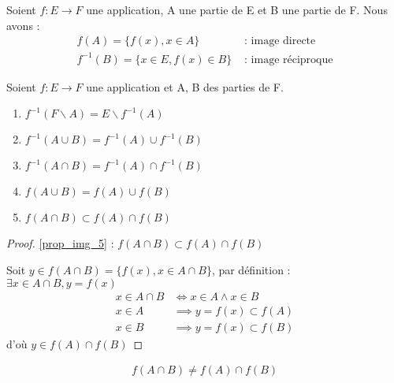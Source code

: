 \begin{definition}
	Soient $f:E \to F$ une application, A une partie de E et B une partie de F. Nous avons :
	\begin{align*}
		f(A) = \{f(x), x \in A\} &\text{ : image directe} \\
		f^{-1}(B) = \{x \in E, f(x) \in B\} &\text{ : image réciproque}
	\end{align*}
\end{definition}
\clearpage
\begin{proposition}
	Soient $f:E \to F$ une application et A, B des parties de F.
	\begin{enumerate}
		\item \label{prop_img_1} $f^{-1}(F \backslash A) = E \backslash f^{-1}(A)$
		\item \label{prop_img_2} $f^{-1}(A \cup B) = f^{-1}(A) \cup f^{-1}(B)$
		\item \label{prop_img_3} $f^{-1}(A \cap B) = f^{-1}(A) \cap f^{-1}(B)$
		\item \label{prop_img_4} $f(A \cup B) = f(A) \cup f(B)$
		\item \label{prop_img_5} $f(A \cap B) \subset f(A) \cap f(B)$
	\end{enumerate}
\end{proposition}

\begin{proof}
	\ref{prop_img_5} : $f(A \cap B) \subset f(A) \cap f(B)$ \\
	\par \noindent Soit $y \in f(A \cap B) = \{f(x), x \in A \cap B\}$, par définition : $\exists x \in A \cap B, y = f(x)$
	\begin{align*}
		x \in A \cap B &\iff x \in A \wedge x \in B \\
		x \in A &\implies y = f(x) \subset f(A) \\
		x \in B &\implies y = f(x) \subset f(B) 
	\end{align*}
	d'où $y \in f(A) \cap f(B)$
\end{proof} 

\begin{remarque}
	\begin{align*}
		f(A \cap B) \neq f(A) \cap f(B)
	\end{align*}
\end{remarque}
